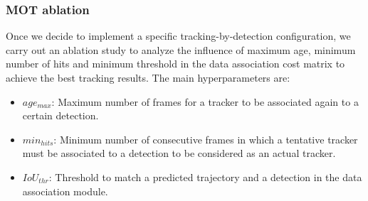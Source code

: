 
\subsubsection{MOT ablation}
\label{subsubsec:4_mot_ablation}

Once we decide to implement a specific tracking-by-detection configuration, we carry out an ablation study to analyze the influence of maximum age, minimum number of hits and minimum threshold in the data association cost matrix to achieve the best tracking results. The main hyperparameters are:

\begin{itemize}
	
	\item \textbf{$age_{max}$}: Maximum number of frames for a tracker to be associated again to a certain detection.
	
	\item \textbf{$min_{hits}$}: Minimum number of consecutive frames in which a tentative tracker must be associated to a detection to be considered as an actual tracker.
	
	\item \textbf{$IoU_{thr}$}: Threshold to match a predicted trajectory and a detection in the data association module.
	
\end{itemize}

